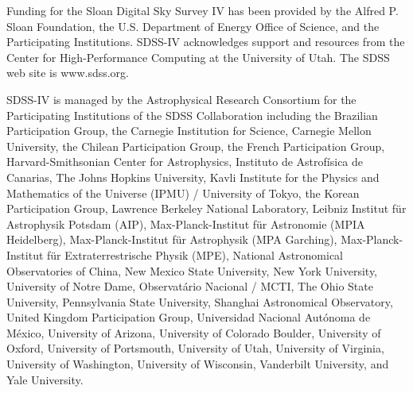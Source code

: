 \documentclass[twocolumn]{aastex62}
\begin{document}
Funding for the Sloan Digital Sky Survey IV has been provided by the Alfred P. Sloan Foundation, the U.S. Department of Energy Office of Science, and the Participating Institutions. SDSS-IV acknowledges
support and resources from the Center for High-Performance Computing at
the University of Utah. The SDSS web site is www.sdss.org.

SDSS-IV is managed by the Astrophysical Research Consortium for the 
Participating Institutions of the SDSS Collaboration including the 
Brazilian Participation Group, the Carnegie Institution for Science, 
Carnegie Mellon University, the Chilean Participation Group, the French Participation Group, Harvard-Smithsonian Center for Astrophysics, 
Instituto de Astrof\'isica de Canarias, The Johns Hopkins University, Kavli Institute for the Physics and Mathematics of the Universe (IPMU) / 
University of Tokyo, the Korean Participation Group, Lawrence Berkeley National Laboratory, 
Leibniz Institut f\"ur Astrophysik Potsdam (AIP),  
Max-Planck-Institut f\"ur Astronomie (MPIA Heidelberg), 
Max-Planck-Institut f\"ur Astrophysik (MPA Garching), 
Max-Planck-Institut f\"ur Extraterrestrische Physik (MPE), 
National Astronomical Observatories of China, New Mexico State University, 
New York University, University of Notre Dame, 
Observat\'ario Nacional / MCTI, The Ohio State University, 
Pennsylvania State University, Shanghai Astronomical Observatory, 
United Kingdom Participation Group,
Universidad Nacional Aut\'onoma de M\'exico, University of Arizona, 
University of Colorado Boulder, University of Oxford, University of Portsmouth, 
University of Utah, University of Virginia, University of Washington, University of Wisconsin, 
Vanderbilt University, and Yale University.

%
% 





 


\end{document}
